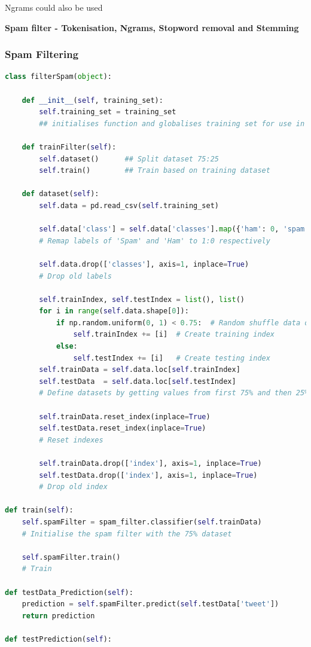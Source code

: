 \documentclass[oneside, 12pt]{article}
\begin{document}
			Ngrams could also be used
			
			\textbf{Spam filter - Tokenisation, Ngrams, Stopword removal and Stemming}
			
			\subsubsection{Spam Filtering}
				\begin{lstlisting}[language=python, caption=Spam filter training Class]
class filterSpam(object):
				
	def __init__(self, training_set):
		self.training_set = training_set	
		## initialises function and globalises training set for use in every function where needed
				
	def trainFilter(self):
		self.dataset()		## Split dataset 75:25
		self.train()		## Train based on training dataset
				
	def dataset(self):
		self.data = pd.read_csv(self.training_set)
				
		self.data['class'] = self.data['classes'].map({'ham': 0, 'spam': 1})
		# Remap labels of 'Spam' and 'Ham' to 1:0 respectively
				
		self.data.drop(['classes'], axis=1, inplace=True)
		# Drop old labels
				
		self.trainIndex, self.testIndex = list(), list()
		for i in range(self.data.shape[0]):
			if np.random.uniform(0, 1) < 0.75:	# Random shuffle data of 75%
				self.trainIndex += [i]	# Create training index
			else:
				self.testIndex += [i]	# Create testing index
		self.trainData = self.data.loc[self.trainIndex]
		self.testData  = self.data.loc[self.testIndex]
		# Define datasets by getting values from first 75% and then 25%
				
		self.trainData.reset_index(inplace=True)
		self.testData.reset_index(inplace=True)		
		# Reset indexes
				
		self.trainData.drop(['index'], axis=1, inplace=True)
		self.testData.drop(['index'], axis=1, inplace=True)
		# Drop old index
				
def train(self):
	self.spamFilter = spam_filter.classifier(self.trainData)
	# Initialise the spam filter with the 75% dataset
				
	self.spamFilter.train()
	# Train
				
def testData_Prediction(self):
	prediction = self.spamFilter.predict(self.testData['tweet'])	
	return prediction
				
def testPrediction(self):
				

\end{lstlisting}
\end{document}
